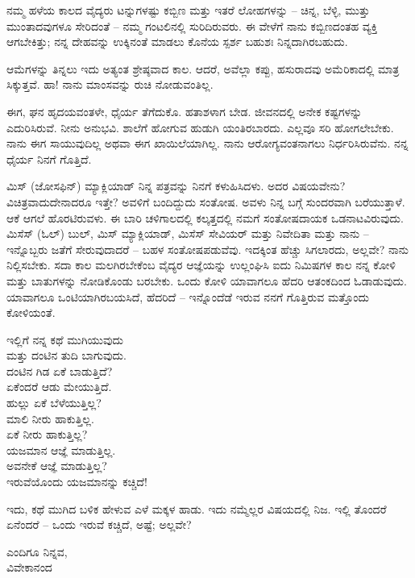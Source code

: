 ನಮ್ಮ ಹಳೆಯ ಕಾಲದ ವೈದ್ಯರು ಟನ್ನುಗಳಷ್ಟು ಕಬ್ಬಿಣ ಮತ್ತು ಇತರೆ ಲೋಹಗಳನ್ನು – ಚಿನ್ನ, ಬೆಳ್ಳಿ, ಮುತ್ತು ಮುಂತಾದವುಗಳೂ ಸೇರಿದಂತೆ – ನಮ್ಮ ಗಂಟಲಿ‌ನಲ್ಲಿ ಸುರಿದಿರುವರು. ಈ ವೇಳೆಗೆ ನಾನು ಕಬ್ಬಿಣದಂತಹ ವ್ಯಕ್ತಿ ಆಗಬೇಕಿತ್ತು; ನನ್ನ ದೇಹವನ್ನು ಉಕ್ಕಿನಂತೆ ಮಾಡಲು ಕೊನೆಯ ಸ್ಪರ್ಶ ಬಹುಶಃ ನಿನ್ನದಾಗಿರಬಹುದು.

ಆಮೆಗಳನ್ನು ತಿನ್ನಲು ಇದು ಅತ್ಯಂತ ಶ್ರೇಷ್ಠವಾದ ಕಾಲ. ಆದರೆ, ಅವೆಲ್ಲಾ ಕಪ್ಪು, ಹಸುರಾದವು ಅಮೆರಿಕಾದಲ್ಲಿ ಮಾತ್ರ ಸಿಕ್ಕುತ್ತವೆ. ಹಾ! ನಾನು ಮಾಂಸವನ್ನು ರುಚಿ ನೋಡುವಂತಿಲ್ಲ.

ಈಗ, ಘನ ಹೃದಯವಂತಳೇ, ಧೈರ್ಯ ತೆಗೆದುಕೊ. ಹತಾಶಳಾಗ ಬೇಡ. ಜೀವನದಲ್ಲಿ ಅನೇಕ ಕಷ್ಟಗಳನ್ನು ಎದುರಿಸಿರುವೆ. ನೀನು ಅನುಭವಿ. ಶಾಲೆಗೆ ಹೋಗುವ ಹುಡುಗಿ ಯಂತಿರಬಾರದು. ಎಲ್ಲವೂ ಸರಿ ಹೋಗಲೇಬೇಕು. ನಾನು ಈಗ ಸಾಯುವುದಿಲ್ಲ ಅಥವಾ ಈಗ ಖಾಯಿಲೆಯಾಗಿಲ್ಲ. ನಾನು ಆರೋಗ್ಯವಂತನಾಗಲು ನಿರ್ಧರಿಸಿರುವೆನು. ನನ್ನ ಧೈರ್ಯ ನಿನಗೆ ಗೊತ್ತಿದೆ.

ಮಿಸ್ (ಜೋಸಫಿನ್) ಮ್ಯಾಕ್ಲಿಯಾಡ್ ನಿನ್ನ ಪತ್ರವನ್ನು ನಿನಗೆ ಕಳುಹಿಸಿದಳು. ಅದರ ವಿಷಯವೇನು? ವಿಚಿತ್ರವಾದುದೇನಾದರೂ ಇತ್ತೇ? ಅವಳಿಗೆ ಬಂದಿದ್ದುದು ಸಂತೋಷ. ಅವಳು ನಿನ್ನ ಬಗ್ಗೆ ಸುಂದರವಾಗಿ ಬರೆಯುತ್ತಾಳೆ. ಆಕೆ ಆಗಲೆ ಹೊರಟಿರುವಳು. ಈ ಬಾರಿ ಚಳಿಗಾಲದಲ್ಲಿ ಕಲ್ಕತ್ತದಲ್ಲಿ ನಮಗೆ ಸಂತೋಷದಾಯಕ ಒಡನಾಟವಿರುವುದು. ಮಿಸೆಸ್ (ಓಲ್) ಬುಲ್, ಮಿಸ್ ಮ್ಯಾಕ್ಲಿಯಾಡ್, ಮಿಸೆಸ್ ಸೇವಿಯರ್ ಮತ್ತು ನಿವೇದಿತಾ ಮತ್ತು ನಾನು – ಇನ್ನೊಬ್ಬರು ಜತೆಗೆ ಸೇರುವುದಾದರೆ – ಬಹಳ ಸಂತೋಷಪಡುವೆವು. ಇದಕ್ಕಿಂತ ಹೆಚ್ಚು ಸಿಗಲಾರದು, ಅಲ್ಲವೇ? ನಾನು ನಿಲ್ಲಿಸಬೇಕು. ಸದಾ ಕಾಲ ಮಲಗಿರಬೇಕೆಂಬ ವೈದ್ಯರ ಆಜ್ಞೆಯನ್ನು ಉಲ್ಲಂಘಿಸಿ ಐದು ನಿಮಿಷಗಳ ಕಾಲ ನನ್ನ ಕೋಳಿ ಮತ್ತು ಬಾತುಗಳನ್ನು ನೋಡಿಕೊಂಡು ಬರಬೇಕು. ಒಂದು ಕೋಳಿ ಯಾವಾಗಲೂ ಹೆದರಿ ಆತಂಕದಿಂದ ಓಡಾಡುವುದು. ಯಾವಾಗಲೂ ಒಂಟಿಯಾಗಿರಬಯಸಿದೆ, ಹೆದರಿದೆ – ಇನ್ನೊಂದೆಡೆ ಇರುವ ನನಗೆ ಗೊತ್ತಿರುವ ಮತ್ತೊಂದು ಕೋಳಿಯಂತೆ.

\begin{myquote}
ಇಲ್ಲಿಗೆ ನನ್ನ ಕಥೆ ಮುಗಿಯುವುದು\\ಮತ್ತು ದಂಟಿನ ತುದಿ ಬಾಗುವುದು.\\ದಂಟಿನ ಗಿಡ ಏಕೆ ಬಾಡುತ್ತಿದೆ?\\ಏಕೆಂದರೆ ಆಡು ಮೇಯುತ್ತಿದೆ.\\ಹುಲ್ಲು ಏಕೆ ಬೆಳೆಯುತ್ತಿಲ್ಲ?\\ಮಾಲಿ ನೀರು ಹಾಕುತ್ತಿಲ್ಲ.\\ಏಕೆ ನೀರು ಹಾಕುತ್ತಿಲ್ಲ?\\ಯಜಮಾನ ಆಜ್ಞೆ ಮಾಡುತ್ತಿಲ್ಲ.\\ಅವನೇಕೆ ಆಜ್ಞೆ ಮಾಡುತ್ತಿಲ್ಲ?\\ಇರುವೆಯೊಂದು ಯಜಮಾನನ್ನು ಕಚ್ಚಿದೆ!
\end{myquote}

ಇದು, ಕಥೆ ಮುಗಿದ ಬಳಿಕ ಹೇಳುವ ಎಳೆ ಮಕ್ಕಳ ಹಾಡು. ಇದು ನಮ್ಮೆಲ್ಲರ ವಿಷಯದಲ್ಲಿ ನಿಜ. ಇಲ್ಲಿ ತೊಂದರೆ ಏನೆಂದರೆ – ಒಂದು ಇರುವೆ ಕಚ್ಚಿದೆ, ಅಷ್ಟೆ; ಅಲ್ಲವೇ?

\begin{flushright}
ಎಂದಿಗೂ ನಿನ್ನವ,\\ವಿವೇಕಾನಂದ
\end{flushright}

